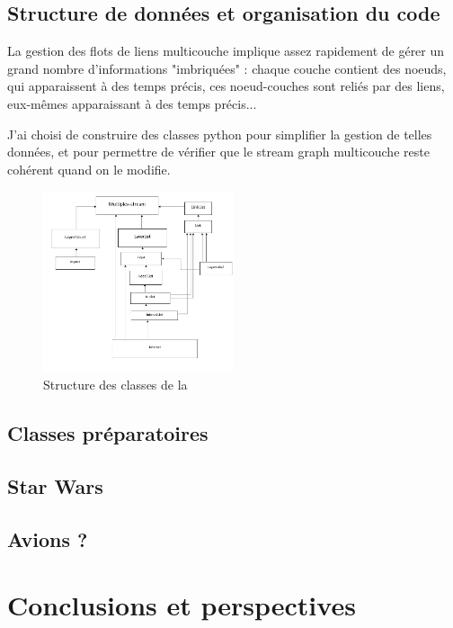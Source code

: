\documentclass[11pt,a4paper]{article}
\theoremstyle{definition}
\theoremstyle{remark}
\theoremstyle{remark}
\begin{document}
\subsection{Structure de données et organisation du code} 
\label{descode}

	La gestion des flots de liens multicouche implique assez rapidement de gérer un grand nombre d'informations "imbriquées" : chaque couche contient des noeuds, qui apparaissent à des temps précis, ces noeud-couches sont reliés par des liens, eux-mêmes apparaissant à des temps précis...
	
	J'ai choisi de construire des classes python pour simplifier la gestion de telles données, et pour permettre de vérifier que le stream graph multicouche reste cohérent quand on le modifie.
	
	\begin{figure}[H]
		\centering
		\includegraphics[width=0.5\textwidth]{codeStructure.JPG}
		\caption{Structure des classes de la }
	\end{figure}

\subsection{Classes préparatoires}
\subsection{Star Wars}
\subsection{Avions ?}

\section{Conclusions et perspectives}

    \nocite{*}
    
	
\end{document}

